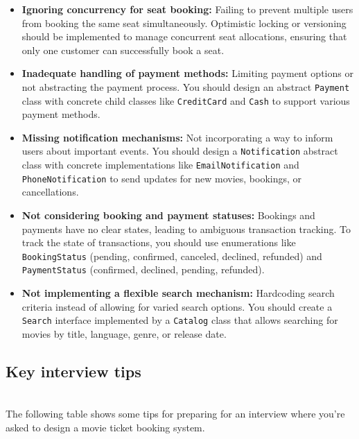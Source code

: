 \begin{itemize}
\item
\protect{}\label{umRBsUkucedXJwWSKwPUZ}
\textbf{Ignoring concurrency for seat booking:} Failing to prevent multiple users from booking the same seat simultaneously. Optimistic locking or versioning should be implemented to manage concurrent seat allocations, ensuring that only one customer can successfully book a seat.
\item
\protect{}\label{vL8CufOpwMk_-JcNg-_AW}
\textbf{Inadequate handling of payment methods:} Limiting payment options or not abstracting the payment process. You should design an abstract \texttt{Payment} class with concrete child classes like \texttt{CreditCard} and \texttt{Cash} to support various payment methods.
\item
\protect{}\label{Jzd8SICLj4TsTeGgOColO}
\textbf{Missing notification mechanisms:} Not incorporating a way to inform users about important events. You should design a \texttt{Notification} abstract class with concrete implementations like \texttt{EmailNotification} and \texttt{PhoneNotification} to send updates for new movies, bookings, or cancellations.
\item
\protect{}\label{TRLsfojBWscpAemcP2nlz}
\textbf{Not considering booking and payment statuses:} Bookings and payments have no clear states, leading to ambiguous transaction tracking. To track the state of transactions, you should use enumerations like \texttt{BookingStatus} (pending, confirmed, canceled, declined, refunded) and \texttt{PaymentStatus} (confirmed, declined, pending, refunded).
\item
\protect{}\label{l8fOAJDOtG1pkfSu1cLM5}
\textbf{Not implementing a flexible search mechanism:} Hardcoding search criteria instead of allowing for varied search options. You should create a \texttt{Search} interface implemented by a \texttt{Catalog} class that allows searching for movies by title, language, genre, or release date.
\end{itemize}

\subsection{Key interview tips}\label{Mkgua2_nhBFO71p3HsQs-}
\\
The following table shows some tips for preparing for an interview where you're asked to design a movie ticket booking system.

